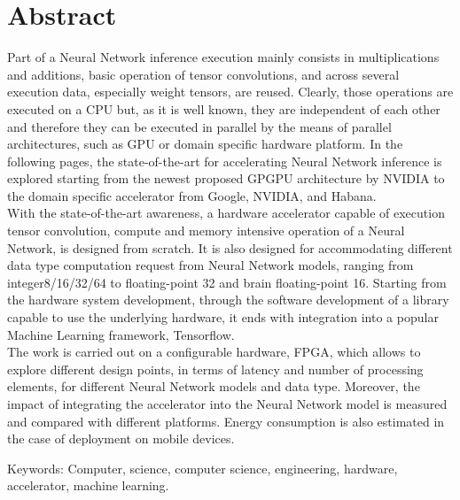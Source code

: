 
\thispagestyle{plain_cover}			%
\setlength{\parskip}{0pt plus 1.0pt}
\section*{Abstract}
Part of a Neural Network inference execution mainly consists in multiplications and additions, basic operation of tensor convolutions, and across several execution data, especially weight tensors, are reused.
Clearly, those operations are executed on a CPU but, as it is well known, they are independent of each other and therefore they can be executed in parallel by the means of parallel architectures, such as GPU or domain specific hardware platform.
In the following pages, the state-of-the-art for accelerating Neural Network inference is explored starting from the newest proposed GPGPU architecture by NVIDIA to the domain specific accelerator from Google, NVIDIA, and Habana.\\
With the state-of-the-art awareness, a hardware accelerator capable of execution tensor convolution,  compute and memory intensive operation of a Neural Network, is designed from scratch. It is also designed for accommodating different data type computation request from Neural Network models, ranging from integer8/16/32/64 to floating-point 32 and brain floating-point 16.
Starting from the hardware system development, through the software development of a library capable to use the underlying hardware, it ends with integration into a popular Machine Learning framework, Tensorflow.\\
The work is carried out on a configurable hardware, FPGA, which allows to explore different design points, in terms of latency and number of processing elements, for different Neural Network models and data type. Moreover, the impact of integrating the accelerator into the Neural Network model is measured and compared with different platforms. Energy consumption is also estimated in the case of deployment on mobile devices.


\vfill
Keywords: Computer, science, computer science, engineering, hardware, accelerator, machine learning.

\newpage				%
\thispagestyle{empty}
\mbox{}